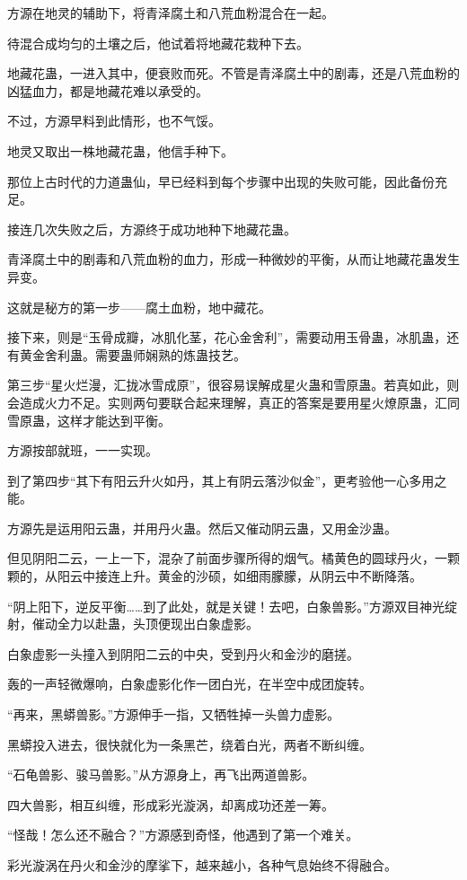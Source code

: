 \begin{this_body}
方源在地灵的辅助下，将青泽腐土和八荒血粉混合在一起。

待混合成均匀的土壤之后，他试着将地藏花栽种下去。

地藏花蛊，一进入其中，便衰败而死。不管是青泽腐土中的剧毒，还是八荒血粉的凶猛血力，都是地藏花难以承受的。

不过，方源早料到此情形，也不气馁。

地灵又取出一株地藏花蛊，他信手种下。

那位上古时代的力道蛊仙，早已经料到每个步骤中出现的失败可能，因此备份充足。

接连几次失败之后，方源终于成功地种下地藏花蛊。

青泽腐土中的剧毒和八荒血粉的血力，形成一种微妙的平衡，从而让地藏花蛊发生异变。

这就是秘方的第一步——腐土血粉，地中藏花。

接下来，则是“玉骨成瓣，冰肌化茎，花心金舍利”，需要动用玉骨蛊，冰肌蛊，还有黄金舍利蛊。需要蛊师娴熟的炼蛊技艺。

第三步“星火烂漫，汇拢冰雪成原”，很容易误解成星火蛊和雪原蛊。若真如此，则会造成火力不足。实则两句要联合起来理解，真正的答案是要用星火燎原蛊，汇同雪原蛊，这样才能达到平衡。

方源按部就班，一一实现。

到了第四步“其下有阳云升火如丹，其上有阴云落沙似金”，更考验他一心多用之能。

方源先是运用阳云蛊，并用丹火蛊。然后又催动阴云蛊，又用金沙蛊。

但见阴阳二云，一上一下，混杂了前面步骤所得的烟气。橘黄色的圆球丹火，一颗颗的，从阳云中接连上升。黄金的沙硕，如细雨朦朦，从阴云中不断降落。

“阴上阳下，逆反平衡……到了此处，就是关键！去吧，白象兽影。”方源双目神光绽射，催动全力以赴蛊，头顶便现出白象虚影。

白象虚影一头撞入到阴阳二云的中央，受到丹火和金沙的磨搓。

轰的一声轻微爆响，白象虚影化作一团白光，在半空中成团旋转。

“再来，黑蟒兽影。”方源伸手一指，又牺牲掉一头兽力虚影。

黑蟒投入进去，很快就化为一条黑芒，绕着白光，两者不断纠缠。

“石龟兽影、骏马兽影。”从方源身上，再飞出两道兽影。

四大兽影，相互纠缠，形成彩光漩涡，却离成功还差一筹。

“怪哉！怎么还不融合？”方源感到奇怪，他遇到了第一个难关。

彩光漩涡在丹火和金沙的摩挲下，越来越小，各种气息始终不得融合。


\end{this_body}

